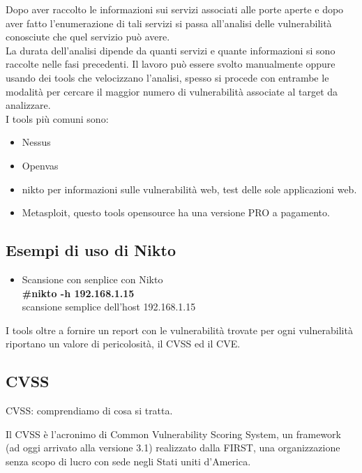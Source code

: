 Dopo aver raccolto le informazioni sui servizi associati alle porte aperte e dopo aver fatto l'enumerazione di tali servizi si passa all'analisi delle vulnerabilità conosciute che quel servizio può avere.\\
La durata dell'analisi dipende da quanti servizi e quante informazioni si sono raccolte nelle fasi precedenti.
Il lavoro può essere svolto manualmente oppure usando dei tools che velocizzano l'analisi, spesso si procede con entrambe le modalità per cercare il maggior numero di vulnerabilità associate al target da analizzare. \\
I tools più comuni sono:
\begin{itemize}
   
  \item Nessus\cite{nessus}
  \item Openvas \cite{openvas}
  \item nikto\cite{nikto} per informazioni sulle vulnerabilità web, test delle sole applicazioni web.
  \item Metasploit\cite{metasploit}, questo tools opensource ha una versione PRO a pagamento.
\end{itemize}

\subsection{Esempi di uso di Nikto}

\begin{itemize}

\item Scansione con senplice con Nikto \\
        \textbf{ \#nikto -h 192.168.1.15} \\
        scansione semplice dell'host 192.168.1.15
\end{itemize}

I tools oltre a fornire un report con le vulnerabilità trovate per ogni vulnerabilità riportano un valore di pericolosità, il CVSS ed il CVE.

\subsection{CVSS}

CVSS: comprendiamo di cosa si tratta.

Il CVSS\cite{CVSS} è l’acronimo di Common Vulnerability Scoring System, un framework (ad oggi arrivato alla versione 3.1) realizzato dalla FIRST\cite{First}, una organizzazione senza scopo di lucro con sede negli Stati uniti d’America.

